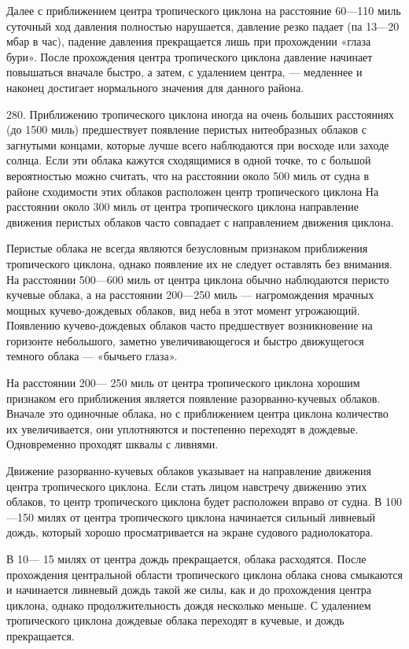 Далее с приближением центра тропического циклона на расстояние 60—110 миль суточный ход давления полностью нарушается, давление резко падает (па 13—20 мбар в час), падение давления прекращается лишь при прохождении «глаза бури». После прохождения центра тропического циклона давление начинает повышаться вначале быстро, а затем, с удалением центра, — медленнее и наконец достигает нормального значения для данного района.

280. Приближению тропического циклона иногда на очень больших расстояниях (до 1500 миль) предшествует появление перистых нитеобразных облаков с загнутыми концами, которые лучше всего наблюдаются при восходе или заходе солнца. Если эти облака кажутся сходящимися в одной точке, то с большой вероятностью можно считать, что на расстоянии около 500 миль от судна в районе сходимости этих облаков расположен центр тропического циклона На расстоянии около 300 миль от центра тропического циклона направление движения перистых облаков часто совпадает с направлением движения циклона.

Перистые облака не всегда являются безусловным признаком приближения тропического циклона, однако появление их не следует оставлять без внимания. На расстоянии 500—600 миль от центра циклона обычно наблюдаются перисто кучевые облака, а на расстоянии 200—250 миль — нагромождения мрачных мощных кучево-дождевых облаков, вид неба в этот момент угрожающий. Появлению кучево-дождевых облаков часто предшествует возникновение на горизонте небольшого, заметно увеличивающегося и быстро движущегося темного облака — «бычьего глаза».

На расстоянии 200— 250 миль от центра тропического циклона хорошим признаком его приближения является появление разорванно-кучевых облаков. Вначале это одиночные облака, но с приближением центра циклона количество их увеличивается, они уплотняются и постепенно переходят в дождевые. Одновременно проходят шквалы с ливнями.

Движение разорванно-кучевых облаков указывает на направление движения центра тропического циклона. Если стать лицом навстречу движению этих облаков, то центр тропического циклона будет расположен вправо от судна. В 100—150 милях от центра тропического циклона начинается сильный ливневый дождь, который хорошо просматривается на экране судового радиолокатора.

В 10— 15 милях от центра дождь прекращается, облака расходятся. После прохождения центральной области тропического циклона облака снова смыкаются и начинается ливневый дождь такой же силы, как и до прохождения центра циклона, однако продолжительность дождя несколько меньше. С удалением тропического циклона дождевые облака переходят в кучевые, и дождь прекращается.

